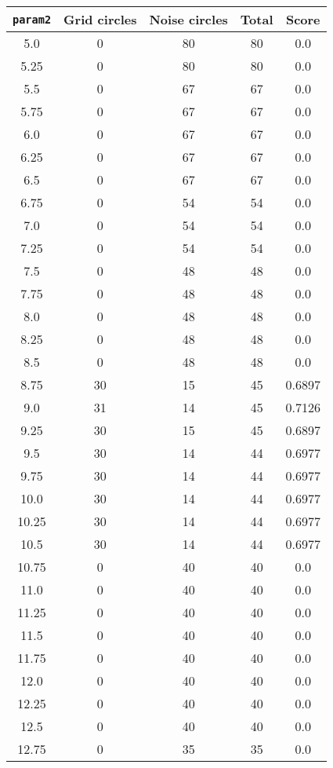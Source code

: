 \documentclass[letterpaper, 12pt]{article}
\begin{document}
\begin{longtable}{|c|c|c|c|c|}
\hline
\textbf{\texttt{param2}} & \textbf{Grid circles} & \textbf{Noise circles} & \textbf{Total} & \textbf{Score} \\
\hline
5.0 & 0 & 80 & 80 & 0.0 \\
\hline
5.25 & 0 & 80 & 80 & 0.0 \\
\hline
5.5 & 0 & 67 & 67 & 0.0 \\
\hline
5.75 & 0 & 67 & 67 & 0.0 \\
\hline
6.0 & 0 & 67 & 67 & 0.0 \\
\hline
6.25 & 0 & 67 & 67 & 0.0 \\
\hline
6.5 & 0 & 67 & 67 & 0.0 \\
\hline
6.75 & 0 & 54 & 54 & 0.0 \\
\hline
7.0 & 0 & 54 & 54 & 0.0 \\
\hline
7.25 & 0 & 54 & 54 & 0.0 \\
\hline
7.5 & 0 & 48 & 48 & 0.0 \\
\hline
7.75 & 0 & 48 & 48 & 0.0 \\
\hline
8.0 & 0 & 48 & 48 & 0.0 \\
\hline
8.25 & 0 & 48 & 48 & 0.0 \\
\hline
8.5 & 0 & 48 & 48 & 0.0 \\
\hline
8.75 & 30 & 15 & 45 & 0.6897 \\
\hline
9.0 & 31 & 14 & 45 & 0.7126 \\
\hline
9.25 & 30 & 15 & 45 & 0.6897 \\
\hline
9.5 & 30 & 14 & 44 & 0.6977 \\
\hline
9.75 & 30 & 14 & 44 & 0.6977 \\
\hline
10.0 & 30 & 14 & 44 & 0.6977 \\
\hline
10.25 & 30 & 14 & 44 & 0.6977 \\
\hline
10.5 & 30 & 14 & 44 & 0.6977 \\
\hline
10.75 & 0 & 40 & 40 & 0.0 \\
\hline
11.0 & 0 & 40 & 40 & 0.0 \\
\hline
11.25 & 0 & 40 & 40 & 0.0 \\
\hline
11.5 & 0 & 40 & 40 & 0.0 \\
\hline
11.75 & 0 & 40 & 40 & 0.0 \\
\hline
12.0 & 0 & 40 & 40 & 0.0 \\
\hline
12.25 & 0 & 40 & 40 & 0.0 \\
\hline
12.5 & 0 & 40 & 40 & 0.0 \\
\hline
12.75 & 0 & 35 & 35 & 0.0 \\

\end{longtable}
\end{document}
